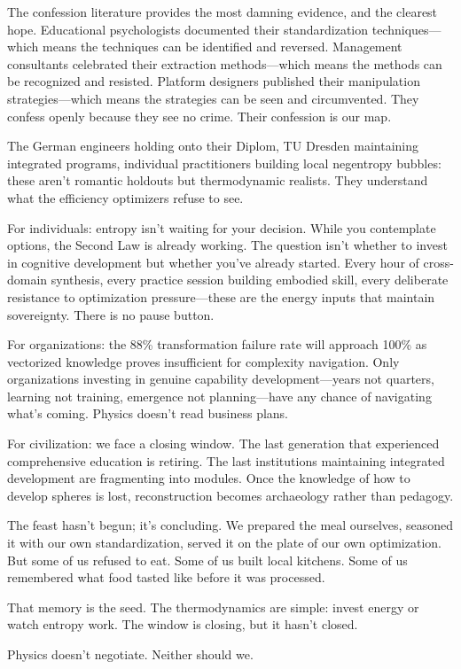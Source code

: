 The confession literature provides the most damning evidence, and the clearest hope. Educational psychologists documented their standardization techniques—which means the techniques can be identified and reversed. Management consultants celebrated their extraction methods—which means the methods can be recognized and resisted. Platform designers published their manipulation strategies—which means the strategies can be seen and circumvented. They confess openly because they see no crime. Their confession is our map.

The German engineers holding onto their Diplom, TU Dresden maintaining integrated programs, individual practitioners building local negentropy bubbles: these aren't romantic holdouts but thermodynamic realists. They understand what the efficiency optimizers refuse to see.

For individuals: entropy isn't waiting for your decision. While you contemplate options, the Second Law is already working. The question isn't whether to invest in cognitive development but whether you've already started. Every hour of cross-domain synthesis, every practice session building embodied skill, every deliberate resistance to optimization pressure—these are the energy inputs that maintain sovereignty. There is no pause button.

For organizations: the 88\% transformation failure rate will approach 100\% as vectorized knowledge proves insufficient for complexity navigation. Only organizations investing in genuine capability development—years not quarters, learning not training, emergence not planning—have any chance of navigating what's coming. Physics doesn't read business plans.

For civilization: we face a closing window. The last generation that experienced comprehensive education is retiring. The last institutions maintaining integrated development are fragmenting into modules. Once the knowledge of how to develop spheres is lost, reconstruction becomes archaeology rather than pedagogy.

The feast hasn't begun; it's concluding. We prepared the meal ourselves, seasoned it with our own standardization, served it on the plate of our own optimization. But some of us refused to eat. Some of us built local kitchens. Some of us remembered what food tasted like before it was processed.

That memory is the seed. The thermodynamics are simple: invest energy or watch entropy work. The window is closing, but it hasn't closed.

Physics doesn't negotiate. Neither should we.